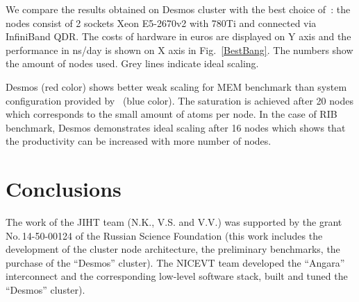 \documentclass{llncs}
\begin{document}
We compare the results obtained on Desmos cluster with the best choice of~\cite{Kutzner2015}: the nodes consist of 2 sockets Xeon E5-2670v2 with 780Ti and connected via InfiniBand QDR. The costs of hardware in euros are displayed on Y axis and the performance in ns/day is shown on X axis in Fig.~\ref{BestBang}. The numbers show the amount of nodes used. Grey lines indicate ideal scaling.

Desmos (red color) shows better weak scaling for MEM benchmark than system configuration provided by~\cite{Kutzner2015} (blue color). The saturation is achieved after 20 nodes which corresponds to the small amount of atoms per node. In the case of RIB benchmark, Desmos demonstrates ideal scaling after 16 nodes which shows that the productivity can be increased with more number of nodes.


\section{Conclusions}

The work of the JIHT team (N.K., V.S. and V.V.) was supported by the grant No.\,14-50-00124 of the Russian Science Foundation (this work includes the development of the cluster node architecture, the preliminary benchmarks, the purchase of the ``Desmos'' cluster). The NICEVT team developed the ``Angara'' interconnect and the corresponding low-level software stack, built and tuned the ``Desmos'' cluster).



\end{document}
